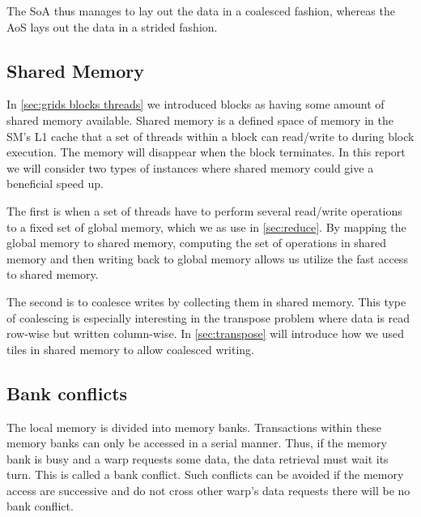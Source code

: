 The SoA thus manages to lay out the data in a coalesced fashion, whereas the AoS lays out the data in a strided fashion.

\subsection{Shared Memory}
\label{sec:shared memory}

In \cref{sec:grids blocks threads} we introduced blocks as having some amount of shared memory available.
Shared memory is a defined space of memory in the SM's L1 cache that a set of threads within a block can read/write to during block execution.
The memory will disappear when the block terminates.
In this report we will consider two types of instances where shared memory could give a beneficial speed up.

The first is when a set of threads have to perform several read/write operations to a fixed set of global memory, which we as use in \cref{sec:reduce}.
By mapping the global memory to shared memory, computing the set of operations in shared memory and then writing back to global memory allows us utilize the fast access to shared memory.

The second is to coalesce writes by collecting them in shared memory.
This type of coalescing is especially interesting in the transpose problem where data is read row-wise but written column-wise. 
In \cref{sec:transpose} will introduce how we used tiles in shared memory to allow coalesced writing.

\subsection{Bank conflicts}
\label{sec:bank conflicts}

The local memory is divided into memory banks.
Transactions within these memory banks can only be accessed in a serial manner.
Thus, if the memory bank is busy and a warp requests some data, the data retrieval must wait its turn.
This is called a bank conflict.
Such conflicts can be avoided if the memory access are successive and do not cross other warp's data requests there will be no bank conflict.~\cite{farber2011cuda}
